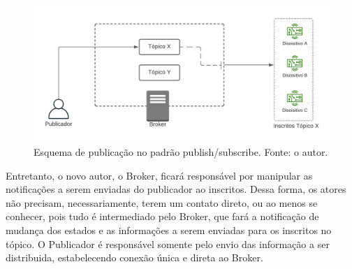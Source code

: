\begin{figure}[H]
    \centering
	\includegraphics[scale=0.90]{topics/pubsub.png}
	\caption{Esquema de publicação no padrão publish/subscribe. Fonte: o autor.}
	\label{fig:pubsub}
\end{figure}

Entretanto, o novo autor, o Broker, ficará responsável por manipular as notificações a serem enviadas do publicador ao inscritos. Dessa forma, os atores não precisam, necessariamente, terem um contato direto, ou ao menos se conhecer, pois tudo é intermediado pelo Broker, que fará a notificação de mudança dos estados e as informações a serem enviadas para os inscritos no tópico. O Publicador é responsável somente pelo envio das informação a ser distribuida, estabelecendo conexão única e direta ao Broker.

